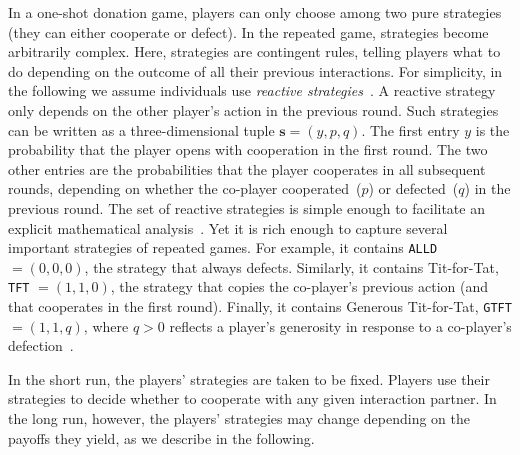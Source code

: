 \documentclass[11pt]{article}
\def\alld{\texttt{ALLD}}
\def\tft{\texttt{TFT}}
\def\gtft{\texttt{GTFT}}
\theoremstyle{plainCl1}
\theoremstyle{plainCl2}
\begin{document}

In a one-shot donation game, players can only choose among two pure strategies (they can either cooperate or defect).
In the repeated game, strategies become arbitrarily complex. 
Here, strategies are contingent rules, telling players what to do depending on the outcome of all their previous interactions. 
For simplicity, in the following we assume individuals use {\it reactive strategies}~\citep{Nowak1992tit}. 
A reactive strategy only depends on the other player's action in the previous round. 
Such strategies can be written as a three-dimensional tuple \(\mathbf{s}=(y, p,q)\). 
The first entry \(y\) is the probability that the player opens with cooperation in the first round. 
The two other entries are the probabilities that the player cooperates in all subsequent rounds, depending on whether the co-player cooperated~($p$) or defected~($q$) in the previous round. 
The set of reactive strategies is simple enough to facilitate an explicit mathematical analysis~\citep{hofbauer1998evolutionary}. 
Yet it is rich enough to capture several important strategies of repeated games. 
For example, it contains \alld{} $=\!(0,0,0)$, the strategy that always defects. 
Similarly, it contains Tit-for-Tat, \tft{} $=\!(1,1,0)$, the strategy that copies the co-player's previous action (and that cooperates in the first round). 
Finally, it contains Generous Tit-for-Tat, \gtft $=\!(1,1,q)$, where $q\!>\!0$ reflects a player's generosity in response to a co-player's defection~\citep{molander:jcr:1985,Nowak1992tit}.  

In the short run, the players' strategies are taken to be fixed.
Players use their strategies to decide whether to cooperate with any given interaction partner. 
In the long run, however, the players' strategies may change depending on the payoffs they yield, as we describe in the following.\\
 
\end{document}
